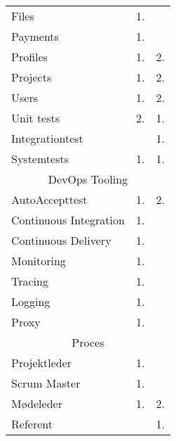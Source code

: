 \begin{table}[H]
\begin{tabular}{lcc}
    Files                  & 1.              &                \\
    Payments               & 1.              &                \\
    Profiles               & 1.              & 2.             \\
    Projects               & 1.              & 2.             \\
    Users                  & 1.              & 2.             \\
    Unit tests             & 2.              & 1.             \\
    Integrationtest        &                 & 1.             \\ 
    Systemtests            & 1.              & 1.             \\ \hline
    \multicolumn{3}{c}{DevOps Tooling}                        \\ \hline
    AutoAccepttest         & 1.              & 2.             \\
    Continuous Integration & 1.              &                \\
    Continuous Delivery    & 1.              &                \\
    Monitoring             & 1.              &                \\
    Tracing                & 1.              &                \\
    Logging                & 1.              &                \\
    Proxy                  & 1.              &                \\ \hline
    \multicolumn{3}{c}{Proces}                                \\ \hline

    Projektleder           & 1.              &                \\
    Scrum Master           & 1.              &                \\
    Mødeleder              & 1.              & 2.             \\
    Referent               &                 & 1.             \\
  \end{tabular}
\end{table}